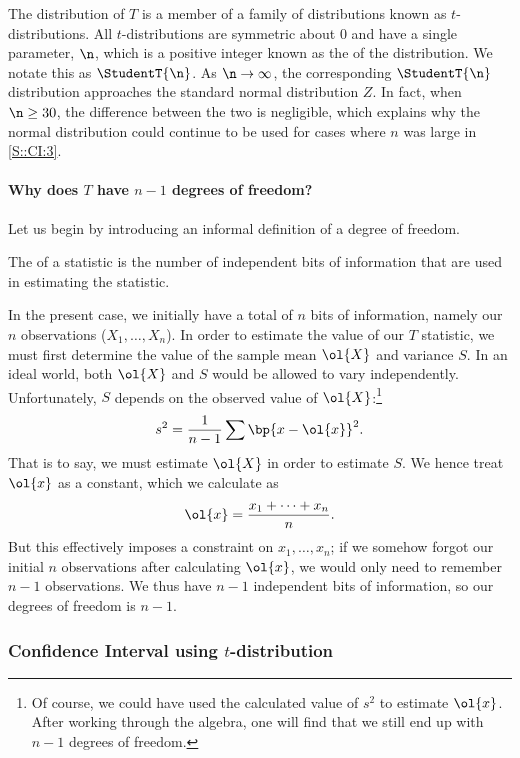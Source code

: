 The distribution of $T$ is a member of a family of distributions known as $t$-distributions. All $t$-distributions are symmetric about 0 and have a single parameter, $\n$, which is a positive integer known as the  of the distribution. We notate this as $\StudentT{\n}$. As $\n \to \infty$, the corresponding $\StudentT{\n}$ distribution approaches the standard normal distribution $Z$. In fact, when $\n \geq 30$, the difference between the two is negligible, which explains why the normal distribution could continue to be used for cases where $n$ was large in \SS\ref{S::CI:3}.

\paragraph{Why does $T$ have $n-1$ degrees of freedom?} Let us begin by introducing an informal definition of a degree of freedom.

\begin{definition}[Informal]
    The  of a statistic is the number of independent bits of information that are used in estimating the statistic.
\end{definition}

In the present case, we initially have a total of $n$ bits of information, namely our $n$ observations ($X_1, \dots, X_n$). In order to estimate the value of our $T$ statistic, we must first determine the value of the sample mean $\ol{X}$ and variance $S$. In an ideal world, both $\ol{X}$ and $S$ would be allowed to vary independently. Unfortunately, $S$ depends on the observed value of $\ol{X}$:\footnote{Of course, we could have used the calculated value of $s^2$ to estimate $\ol{x}$. After working through the algebra, one will find that we still end up with $n-1$ degrees of freedom.} \[s^2 = \frac1{n-1} \sum \bp{x - \ol{x}}^2.\] That is to say, we must estimate $\ol{X}$ in order to estimate $S$. We hence treat $\ol{x}$ as a constant, which we calculate as \[\ol{x} = \frac{x_1 + \dots + x_n}{n}.\] But this effectively imposes a constraint on $x_1, \dots, x_n$; if we somehow forgot our initial $n$ observations after calculating $\ol{x}$, we would only need to remember $n-1$ observations. We thus have $n-1$ independent bits of information, so our degrees of freedom is $n-1$.

\subsubsection{Confidence Interval using $t$-distribution}

